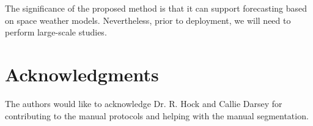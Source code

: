 \documentclass[journal]{IEEEtran}
\begin{document}
The significance of the proposed method is that it can support 
    forecasting based on space weather models.
Nevertheless, prior to deployment, we will need to perform
    large-scale studies.
    
\section* {Acknowledgments}
The authors would like to acknowledge Dr. R. Hock and Callie Darsey
for contributing to the manual protocols and helping with the manual segmentation.

%
%

\end{document}
